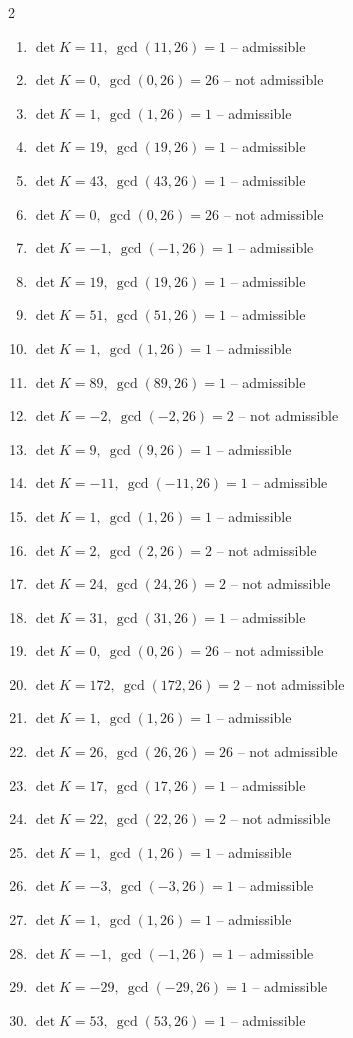 \begin{multicols}{2}\raggedright
\begin{enumerate}[label=\arabic*., leftmargin=*, itemsep=1pt]
\item $\det K=11,\ \gcd(11,26)=1$ – admissible
\item $\det K=0,\ \gcd(0,26)=26$ – not admissible
\item $\det K=1,\ \gcd(1,26)=1$ – admissible
\item $\det K=19,\ \gcd(19,26)=1$ – admissible
\item $\det K=43,\ \gcd(43,26)=1$ – admissible
\item $\det K=0,\ \gcd(0,26)=26$ – not admissible
\item $\det K=-1,\ \gcd(-1,26)=1$ – admissible
\item $\det K=19,\ \gcd(19,26)=1$ – admissible
\item $\det K=51,\ \gcd(51,26)=1$ – admissible
\item $\det K=1,\ \gcd(1,26)=1$ – admissible
\item $\det K=89,\ \gcd(89,26)=1$ – admissible
\item $\det K=-2,\ \gcd(-2,26)=2$ – not admissible
\item $\det K=9,\ \gcd(9,26)=1$ – admissible
\item $\det K=-11,\ \gcd(-11,26)=1$ – admissible
\item $\det K=1,\ \gcd(1,26)=1$ – admissible
\item $\det K=2,\ \gcd(2,26)=2$ – not admissible
\item $\det K=24,\ \gcd(24,26)=2$ – not admissible
\item $\det K=31,\ \gcd(31,26)=1$ – admissible
\item $\det K=0,\ \gcd(0,26)=26$ – not admissible
\item $\det K=172,\ \gcd(172,26)=2$ – not admissible
\item $\det K=1,\ \gcd(1,26)=1$ – admissible
\item $\det K=26,\ \gcd(26,26)=26$ – not admissible
\item $\det K=17,\ \gcd(17,26)=1$ – admissible
\item $\det K=22,\ \gcd(22,26)=2$ – not admissible
\item $\det K=1,\ \gcd(1,26)=1$ – admissible
\item $\det K=-3,\ \gcd(-3,26)=1$ – admissible
\item $\det K=1,\ \gcd(1,26)=1$ – admissible
\item $\det K=-1,\ \gcd(-1,26)=1$ – admissible
\item $\det K=-29,\ \gcd(-29,26)=1$ – admissible
\item $\det K=53,\ \gcd(53,26)=1$ – admissible
\end{enumerate}
\end{multicols}
